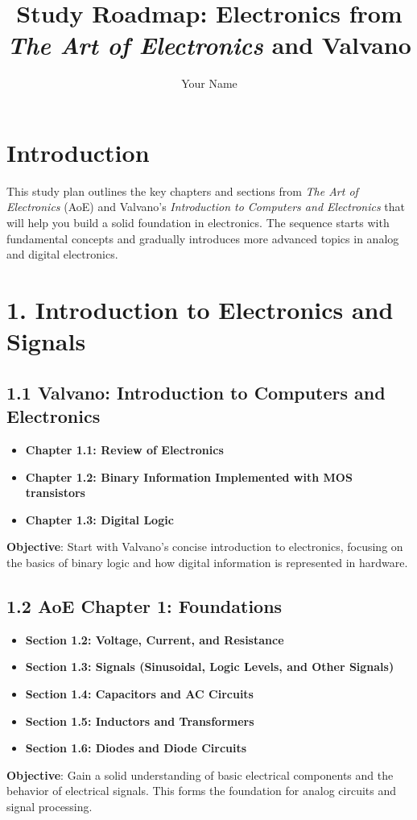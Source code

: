 \documentclass{article}
\title{Study Roadmap: Electronics from \textit{The Art of Electronics} and Valvano}
\author{Your Name}
\date{}
\begin{document}
\maketitle

\section*{Introduction}
This study plan outlines the key chapters and sections from \textit{The Art of Electronics} (AoE) and Valvano’s \textit{Introduction to Computers and Electronics} that will help you build a solid foundation in electronics. The sequence starts with fundamental concepts and gradually introduces more advanced topics in analog and digital electronics.

\section*{1. Introduction to Electronics and Signals}

\subsection*{1.1 Valvano: Introduction to Computers and Electronics}
\begin{itemize}
    \item \textbf{Chapter 1.1: Review of Electronics}
    \item \textbf{Chapter 1.2: Binary Information Implemented with MOS transistors}
    \item \textbf{Chapter 1.3: Digital Logic}
\end{itemize}
\textbf{Objective}: Start with Valvano’s concise introduction to electronics, focusing on the basics of binary logic and how digital information is represented in hardware.

\subsection*{1.2 AoE Chapter 1: Foundations}
\begin{itemize}
    \item \textbf{Section 1.2: Voltage, Current, and Resistance}
    \item \textbf{Section 1.3: Signals (Sinusoidal, Logic Levels, and Other Signals)}
    \item \textbf{Section 1.4: Capacitors and AC Circuits}
    \item \textbf{Section 1.5: Inductors and Transformers}
    \item \textbf{Section 1.6: Diodes and Diode Circuits}
\end{itemize}
\textbf{Objective}: Gain a solid understanding of basic electrical components and the behavior of electrical signals. This forms the foundation for analog circuits and signal processing.
\end{document}
